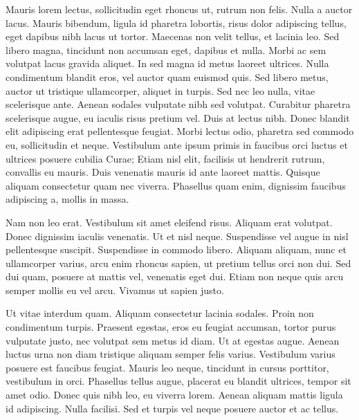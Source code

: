 \begin{acknowledgments}
Mauris lorem lectus, sollicitudin eget rhoncus ut, rutrum non felis.
Nulla a auctor lacus.
Mauris bibendum, ligula id pharetra lobortis, risus dolor adipiscing tellus, eget dapibus nibh lacus ut tortor.
Maecenas non velit tellus, et lacinia leo.
Sed libero magna, tincidunt non accumsan eget, dapibus et nulla.
Morbi ac sem volutpat lacus gravida aliquet.
In sed magna id metus laoreet ultrices.
Nulla condimentum blandit eros, vel auctor quam euismod quis.
Sed libero metus, auctor ut tristique ullamcorper, aliquet in turpis.
Sed nec leo nulla, vitae scelerisque ante.
Aenean sodales vulputate nibh sed volutpat.
Curabitur pharetra scelerisque augue, eu iaculis risus pretium vel.
Duis at lectus nibh.
Donec blandit elit adipiscing erat pellentesque feugiat.
Morbi lectus odio, pharetra sed commodo eu, sollicitudin et neque.
Vestibulum ante ipsum primis in faucibus orci luctus et ultrices posuere cubilia Curae; Etiam nisl elit, facilisis ut hendrerit rutrum, convallis eu mauris.
Duis venenatis mauris id ante laoreet mattis.
Quisque aliquam consectetur quam nec viverra.
Phasellus quam enim, dignissim faucibus adipiscing a, mollis in massa.

Nam non leo erat.
Vestibulum sit amet eleifend risus.
Aliquam erat volutpat.
Donec dignissim iaculis venenatis.
Ut et nisl neque.
Suspendisse vel augue in nisl pellentesque suscipit.
Suspendisse in commodo libero.
Aliquam aliquam, nunc et ullamcorper varius, arcu enim rhoncus sapien, ut pretium tellus orci non dui.
Sed dui quam, posuere at mattis vel, venenatis eget dui.
Etiam non neque quis arcu semper mollis eu vel arcu.
Vivamus ut sapien justo.

Ut vitae interdum quam.
Aliquam consectetur lacinia sodales.
Proin non condimentum turpis.
Praesent egestas, eros eu feugiat accumsan, tortor purus vulputate justo, nec volutpat sem metus id diam.
Ut at egestas augue.
Aenean luctus urna non diam tristique aliquam semper felis varius.
Vestibulum varius posuere est faucibus feugiat.
Mauris leo neque, tincidunt in cursus porttitor, vestibulum in orci.
Phasellus tellus augue, placerat eu blandit ultrices, tempor sit amet odio.
Donec quis nibh leo, eu viverra lorem.
Aenean aliquam mattis ligula id adipiscing.
Nulla facilisi.
Sed et turpis vel neque posuere auctor et ac tellus.
\end{acknowledgments}